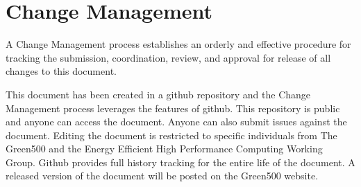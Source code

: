 \chapter{Change Management}
\label{sec:changenotices}

\noindent
A Change Management process establishes an orderly and effective procedure for tracking the submission, coordination, review, and approval for release of all changes to this document.

This document has been created in a github repository and the Change Management process leverages the features of github.
This repository is public and anyone can access the document.  
Anyone can also submit issues against the document.  
Editing the document is restricted to specific individuals from The Green500 and the Energy Efficient High Performance Computing Working Group.
Github provides full history tracking for the entire life of the document.
A released version of the document will be posted on the Green500 website.
